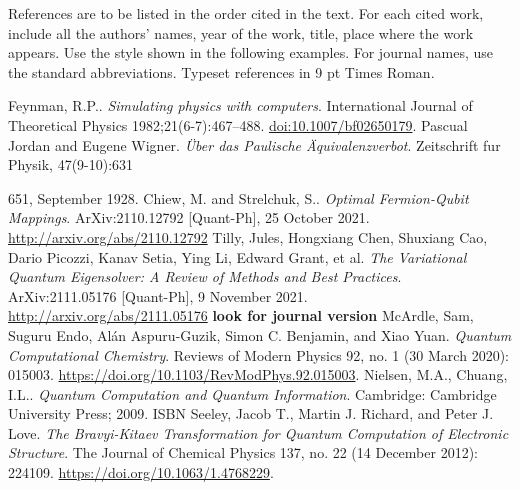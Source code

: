 \documentclass[twoside]{article}
\begin{document}
\noindent
References are to be listed in the order cited in the text.
For each cited work, include all the authors' names, year of the work, title,
place where the work appears.
Use the style shown in the following examples. For journal names,
use the standard abbreviations. Typeset references in 9 pt Times
Roman.
\begin{thebibliography}{000}
         Feynman, R.P.. {\it Simulating physics with computers}. International Journal of Theoretical Physics 1982;21(6-7):467–488. \url{doi:10.1007/bf02650179}.
         Pascual Jordan and Eugene Wigner. {\it  {\"U}ber das Paulische {\"A}quivalenzverbot}. Zeitschrift fur Physik, 47(9-10):631{651, September 1928.
                 Chiew, M. and Strelchuk, S.. {\it Optimal Fermion-Qubit Mappings}. ArXiv:2110.12792 [Quant-Ph], 25 October 2021. \url{http://arxiv.org/abs/2110.12792}
                Tilly, Jules, Hongxiang Chen, Shuxiang Cao, Dario Picozzi, Kanav Setia, Ying Li, Edward Grant, et al. {\it The Variational Quantum Eigensolver: A Review of Methods and Best Practices}. ArXiv:2111.05176 [Quant-Ph], 9 November 2021. \url{http://arxiv.org/abs/2111.05176} \textbf{look for journal version}
                 McArdle, Sam, Suguru Endo, Alán Aspuru-Guzik, Simon C. Benjamin, and Xiao Yuan. {\it Quantum Computational Chemistry}. Reviews of Modern Physics 92, no. 1 (30 March 2020): 015003. \url{https://doi.org/10.1103/RevModPhys.92.015003}.
                 Nielsen, M.A., Chuang, I.L.. {\it Quantum Computation and Quantum Information}. Cambridge: Cambridge University Press; 2009. ISBN
                 Seeley, Jacob T., Martin J. Richard, and Peter J. Love. {\it The Bravyi-Kitaev Transformation for Quantum Computation of Electronic Structure}. The Journal of Chemical Physics 137, no. 22 (14 December 2012): 224109. \url{https://doi.org/10.1063/1.4768229}.

}
\end{thebibliography}
\end{document}
